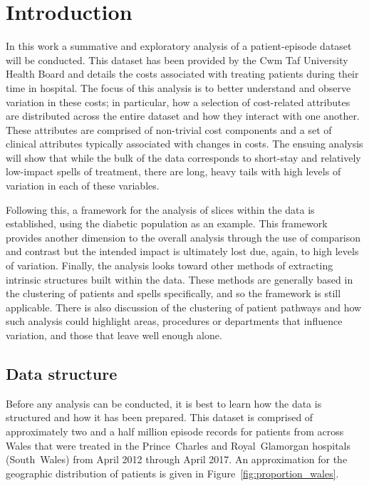 \section{Introduction}\label{sec:intro}

In this work a summative and exploratory analysis of a patient-episode dataset
will be conducted. This dataset has been provided by the Cwm Taf University
Health Board and details the costs associated with treating patients during
their time in hospital. The focus of this analysis is to better understand and
observe variation in these costs; in particular, how a selection of
cost-related attributes are distributed across the entire dataset and how
they interact with one another. These attributes are comprised of non-trivial
cost components and a set of clinical attributes typically associated with
changes in costs. The ensuing analysis will show that while the bulk of the data
corresponds to short-stay and relatively low-impact spells of treatment, there
are long, heavy tails with high levels of variation in each of these variables.

Following this, a framework for the analysis of slices within the data is
established, using the diabetic population as an example. This framework
provides another dimension to the overall analysis through the use of comparison
and contrast but the intended impact is ultimately lost due, again, to high
levels of variation. Finally, the analysis looks toward other methods of
extracting intrinsic structures built within the data. These methods are
generally based in the clustering of patients and spells specifically, and so
the framework is still applicable. There is also discussion of the clustering of
patient pathways and how such analysis could highlight areas, procedures or
departments that influence variation, and those that leave well enough alone.

\subsection{Data structure}\label{subsec:structure}

Before any analysis can be conducted, it is best to learn how the data is
structured and how it has been prepared. This dataset is comprised of
approximately two and a half million episode records for patients from across
Wales that were treated in the Prince~Charles and Royal~Glamorgan hospitals
(South~Wales) from April 2012 through April 2017. An approximation for the
geographic distribution of patients is given in
Figure~\ref{fig:proportion_wales}.

